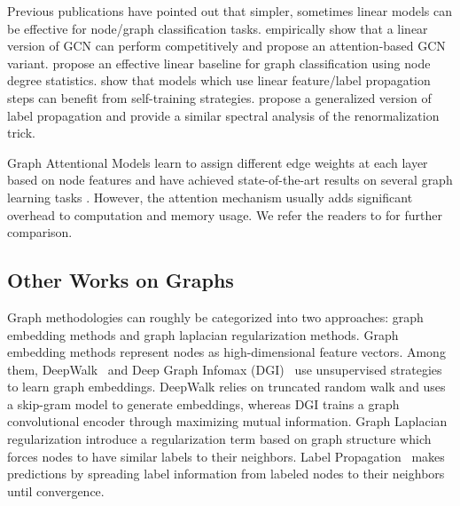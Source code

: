 Previous publications have pointed out that simpler, sometimes linear models can be effective for node/graph classification tasks. \citet{agnn} empirically show that a linear version of GCN can perform competitively and propose an attention-based GCN variant. \citet{cai2018simple} propose an effective linear baseline for graph classification using node degree statistics. \citet{Buchnik18} show that models which use linear feature/label propagation steps can benefit from self-training strategies. 
\citet{Li2019LabelES} propose a generalized version of label propagation and provide a similar spectral analysis of the renormalization trick.



Graph Attentional Models learn to assign different edge weights at each layer based on node features and have achieved state-of-the-art results on several graph learning tasks \citep{gat, agnn, zhang2018gaan, ADGPM}.
However, the attention mechanism usually adds significant overhead to computation and memory usage. 
We refer the readers to \citet{attention-survey} for further comparison.

\subsection{Other Works on Graphs} 
Graph methodologies can roughly be categorized into two approaches: graph embedding methods and graph laplacian regularization methods. 
Graph embedding methods \citep{Weston2008, Perozzi14, Yang16, infomax} represent nodes as high-dimensional feature vectors. 
Among them, DeepWalk~\citep{Perozzi14} and Deep Graph Infomax (DGI)~\citep{infomax} use unsupervised strategies to learn graph embeddings.
DeepWalk relies on truncated random walk and uses a skip-gram model to generate embeddings, whereas DGI trains a graph convolutional encoder through maximizing mutual information. 
Graph Laplacian regularization \citep{Zhu03, Zhou04,Belkin04b,Belkin2006} introduce a regularization term based on graph structure which forces nodes to have similar labels to their neighbors.
Label Propagation~\citep{Zhu03} makes predictions by spreading label information from labeled nodes to their neighbors until convergence. 